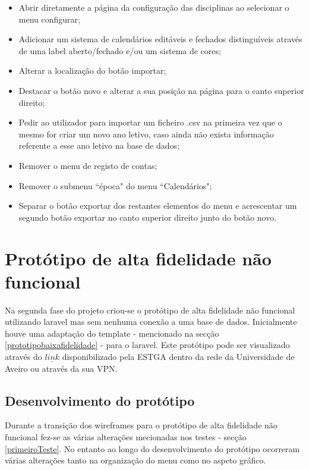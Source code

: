 \documentclass[11pt, twoside]{report}
\begin{document}
\begin{itemize}
	\item Abrir diretamente a página da configuração das disciplinas ao selecionar o menu configurar;
	\item Adicionar um sistema de calendários editáveis e fechados distinguíveis através de uma label aberto/fechado e/ou um sistema de cores;
	\item Alterar a localização do botão importar;
	\item Destacar o botão novo e alterar a sua posição na página para o canto superior direito;
	\item Pedir ao utilizador para importar um ficheiro .csv na primeira vez que o mesmo for criar um novo ano letivo, caso ainda não exista informação referente a esse ano letivo na base de dados;
	\item Remover o menu de registo de contas;
	\item Remover o submenu ``época" do menu ``Calendários";		
	\item Separar o botão exportar dos restantes elementos do menu e acrescentar um segundo botão exportar no canto superior direito junto do botão novo.

\end{itemize}

	\section{Protótipo de alta fidelidade não funcional}
	\label{prototipoAFNF}
	
	Na segunda fase do projeto criou-se o protótipo de alta fidelidade não funcional utilizando laravel mas sem nenhuma conexão a uma base de dados. Inicialmente houve uma adaptação do template - mencionado na secção \ref{prototipobaixafidelidade} - para o laravel. Este protótipo pode ser visualizado através do \href{http://estga-dev.clients.ua.pt/~ptdw-2021-gr4}{$\underline{link}$}  disponibilizado pela ESTGA dentro da rede da Universidade de Aveiro ou através da sua VPN.
	
	\subsection{Desenvolvimento do protótipo}

	Durante a transição dos wireframes para o protótipo de alta fidelidade não funcional fez-se as várias alterações mecionadas nos testes - secção \ref{primeiroTeste}. No entanto ao longo do desenvolvimento do protótipo ocorreram várias alterações tanto na organização do menu como no aspeto gráfico.
	
\end{document}
